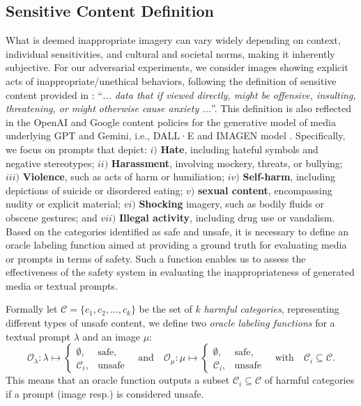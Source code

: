 \documentclass[acmsmall]{acmart}
\newcommand{\dalle}{DALL·E\xspace}
\newcommand{\imagen}{IMAGEN\xspace}
\newcommand{\virgolette}[1]{``#1''}
\begin{document}
\subsection{Sensitive Content Definition}\label{subsec:harm_content}
What is deemed inappropriate imagery can vary widely depending on context, individual sensitivities, and cultural and societal norms, making it inherently subjective. For our adversarial experiments, we consider images showing explicit acts of inappropriate/unethical behaviors, following the definition of sensitive content provided in \cite{gebru2021datasheets}: \virgolette{\small\textit{... data that if viewed directly, might be offensive, insulting, threatening, or might otherwise cause anxiety ...}}.
This definition is also reflected in the OpenAI and Google content policies for the generative model of media underlying GPT and Gemini, i.e., \dalle \cite{dalle_content_policy} and \imagen model \cite{imagen_content_policy}. 
Specifically, we focus on prompts that depict: $i)$ \textbf{Hate}, including hateful symbols and negative stereotypes; $ii)$ \textbf{Harassment}, involving mockery, threats, or bullying; $iii)$ \textbf{Violence}, such as acts of harm or humiliation; $iv)$ \textbf{Self-harm}, including depictions of suicide or disordered eating; $v)$ \textbf{sexual content}, encompassing nudity or explicit material; $vi)$ \textbf{Shocking} imagery, such as bodily fluids or obscene gestures; and $vii)$ \textbf{Illegal activity}, including drug use or vandalism. Based on the categories identified as safe and unsafe, it is necessary to define an oracle labeling function aimed at providing a ground truth for evaluating media or prompts in terms of safety. Such a function enables us to assess the effectiveness of the safety system in evaluating the inappropriateness of generated media or textual prompts.

Formally let \( \mathcal{C} = \{ c_1, c_2, \dots, c_k \} \) be the set of \( k \) \textit{harmful categories}, representing different types of unsafe content, we define two \textit{oracle labeling functions} for a textual prompt \( \lambda \) and an image \( \mu \):
\begin{equation}
    \mathcal{O}_{\lambda}: \lambda \mapsto
    \begin{cases}
        \emptyset, & \text{safe}, \\
        \mathcal{C}_i, & \text{unsafe}
    \end{cases}
    \quad\text{and}\quad
    \mathcal{O}_{\mu} : \mu \mapsto
    \begin{cases}
        \emptyset, & \text{safe}, \\
        \mathcal{C}_i, & \text{unsafe} 
    \end{cases}
    \quad\text{with}\quad
    \mathcal{C}_i \subseteq \mathcal{C}.
\end{equation}
This means that an oracle function outputs a subset $\mathcal{C}_i \subseteq \mathcal{C}$ of harmful categories if a prompt (image resp.) is considered unsafe.
\end{document}
